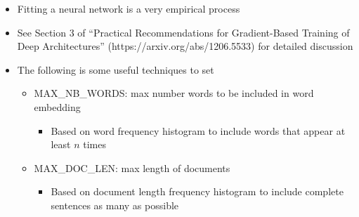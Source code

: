 \documentclass[11pt]{article}
\providecommand{\tightlist}{%
      \setlength{\itemsep}{0pt}\setlength{\parskip}{0pt}}
\begin{document}
\begin{itemize}
\tightlist
\item
  Fitting a neural network is a very empirical process
\item
  See Section 3 of ``Practical Recommendations for Gradient-Based
  Training of Deep Architectures'' (https://arxiv.org/abs/1206.5533) for
  detailed discussion
\item
  The following is some useful techniques to set

  \begin{itemize}
  \tightlist
  \item
    MAX\_NB\_WORDS: max number words to be included in word embedding

    \begin{itemize}
    \tightlist
    \item
      Based on word frequency histogram to include words that appear at
      least \(n\) times
    \end{itemize}
  \item
    MAX\_DOC\_LEN: max length of documents

    \begin{itemize}
    \tightlist
    \item
      Based on document length frequency histogram to include complete
      sentences as many as possible
    \end{itemize}
  \end{itemize}
\end{itemize}
\end{document}
